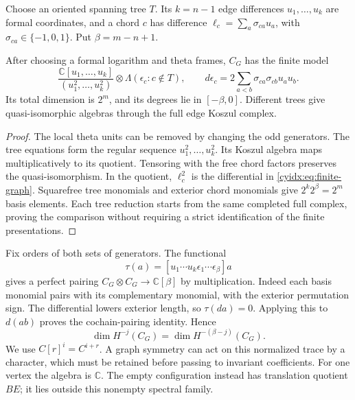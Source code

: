 Choose an oriented spanning tree \(T\). Its
\(k=n-1\) edge differences \(u_1,\ldots,u_k\)
are formal coordinates, and a chord \(c\) has difference
\(\ell_c=\sum_a\sigma_{ca}u_a\), with
\(\sigma_{ca}\in\{-1,0,1\}\). Put \(\beta=m-n+1\).

\begin{theorem}\label{cyidx:thm:finite-graph}
After choosing a formal logarithm and theta frames,
\(C_G\) has the finite model
\begin{equation}\label{cyidx:eq:finite-graph}
 \frac{\mathbb C[u_1,\ldots,u_k]}{(u_1^2,\ldots,u_k^2)}
 \otimes\Lambda(\epsilon_c:c\notin T),\qquad
 d\epsilon_c=2\sum_{a<b}\sigma_{ca}\sigma_{cb}u_au_b.
\end{equation}
Its total dimension is \(2^m\), and its degrees lie in
\([-\beta,0]\). Different trees give quasi-isomorphic
algebras through the full edge Koszul complex.
\end{theorem}
\begin{proof}
The local theta units can be removed by changing the
odd generators. The tree equations form the regular
sequence \(u_1^2,\ldots,u_k^2\). Its Koszul algebra
maps multiplicatively to its quotient. Tensoring with
the free chord factors preserves the quasi-isomorphism.
In the quotient, \(\ell_c^2\) is the differential
in \eqref{cyidx:eq:finite-graph}. Squarefree tree
monomials and exterior chord monomials give
\(2^k2^\beta=2^m\) basis elements. Each tree reduction
starts from the same completed full complex, proving
the comparison without requiring a strict identification
of the finite presentations.
\end{proof}

Fix orders of both sets of generators. The functional
\begin{equation}\label{cyidx:eq:graph-trace}
 \tau(a)=[u_1\cdots u_k\epsilon_1\cdots\epsilon_\beta]a
\end{equation}
gives a perfect pairing \(C_G\otimes C_G\to\mathbb C[\beta]\)
by multiplication. Indeed each basis monomial pairs
with its complementary monomial, with the exterior
permutation sign. The differential lowers exterior
length, so \(\tau(da)=0\). Applying this to \(d(ab)\)
proves the cochain-pairing identity. Hence
\[
 \dim H^{-j}(C_G)=\dim H^{-(\beta-j)}(C_G).
\]
We use \(C[r]^i=C^{i+r}\). A graph symmetry can act
on this normalized trace by a character, which must be
retained before passing to invariant coefficients.
For one vertex the algebra is \(\mathbb C\). The empty
configuration instead has translation quotient \(BE\);
it lies outside this nonempty spectral family.

